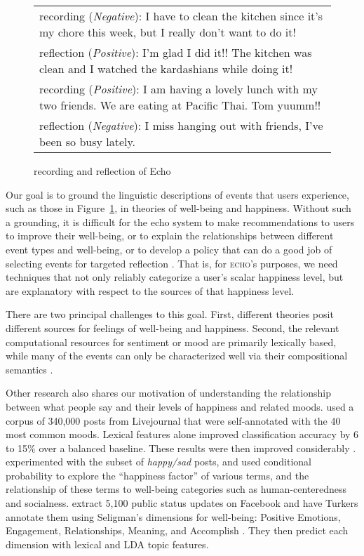 \documentclass[11pt,letterpaper]{article}
\begin{document}
\begin{figure}[t]
\small
\begin{tabularx}{\columnwidth}{X}
\toprule
{\sc recording} (\emph{Negative}): I have to clean the kitchen since it's my chore this week, but I really don't want to do it! \\
{\sc reflection} (\emph{Positive}): I'm glad I did it!! The kitchen was clean and I watched the kardashians while doing it! \\
\midrule 
{\sc recording} (\emph{Positive}): I am having a lovely lunch with my two friends. We are eating at Pacific Thai. Tom yuumm!! \\
{\sc reflection} (\emph{Negative}): I miss hanging out with friends, I've been so busy lately. \\
\bottomrule
\end{tabularx}
\caption{{\sc recording} and {\sc reflection} of Echo}
\label{fig:echo-example}
\end{figure}


Our goal is to ground the linguistic descriptions of events that users
experience, such as those in Figure~\ref{fig:echo-example}, in
theories of well-being and happiness.  Without such a grounding, it is
difficult for the {\sc echo} system to make recommendations to users
to improve their well-being, or to explain the relationships between
different event types and well-being, or to develop a policy
that can do a good job of selecting events
for targeted reflection \cite{konrad2015finding,Isaacsetal13}. That is,
for \textsc{echo}'s purposes, we need techniques that not only reliably
categorize a user's scalar happiness level, but are explanatory with respect
to the sources of that happiness level.

There are two principal challenges to this goal. First,
 different theories posit different sources for feelings of
well-being and happiness.  Second, the relevant
computational resources for sentiment or mood are primarily lexically based, while
many of the events can only be characterized well via their
compositional semantics \cite{ReschkeAnand11}. 

Other research also shares our motivation of understanding the
relationship between what people say and their levels of happiness and
related moods.    used a corpus of
340,000 posts from Livejournal that were self-annotated with the 40
most common moods. Lexical features alone improved classification
accuracy by 6 to 15\% over a balanced baseline.
These results were
then improved considerably
\cite{keshtkar2009using}.  experimented with the
subset of  \emph{happy/sad} posts, and
used conditional probability to explore the ``happiness factor'' of
various terms, and the relationship of
these terms to well-being categories such as human-centeredness and
socialness.  extract 5,100 public status updates
on Facebook and have Turkers annotate them using Seligman's
dimensions for well-being: Positive Emotions, Engagement, Relationships, Meaning, and Accomplish \cite{Seligmanetal06,Forgeardetal11}. They then predict each dimension
with lexical and LDA topic features.
\end{document}
